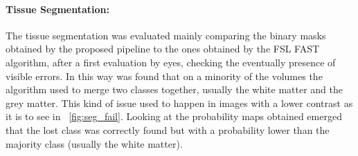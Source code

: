 \documentclass{standalone}
\begin{document}
\paragraph{Tissue Segmentation:}
The tissue segmentation was evaluated mainly comparing the binary masks obtained by the proposed pipeline to the ones obtained by the FSL FAST algorithm, after a first evaluation by eyes, checking the eventually presence of visible errors.
In this way was found that on a minority of the volumes the algorithm used to merge two classes together, usually the white matter and the grey matter.
This kind of issue used to happen in images with a lower contrast as it is to see in \figureautorefname~\ref{fig:seg_fail}.
Looking at the probability maps obtained emerged that the lost class was correctly found but with a probability lower than the majority class (usually the white matter).
\end{document}
